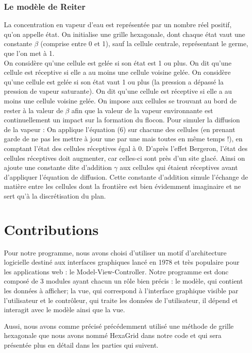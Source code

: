 \documentclass[a4paper,12pt,twoside]{report}
\begin{document}
\subsection{Le modèle de Reiter}La concentration en vapeur d’eau est représentée par un nombre réel positif, qu’on appelle état.
On initialise une grille hexagonale, dont chaque état vaut une constante $\beta$ (comprise entre 0 et 1), sauf la cellule centrale, représentant le germe, que l’on met à 1.\\
On considère qu’une cellule est gelée si son état est 1 ou plus. On dit qu’une cellule est réceptive si elle a au moins une cellule voisine gelée.
\medbreak
On considère qu’une cellule est gelée si son état vaut 1 ou plus (la pression a dépassé la pression de vapeur saturante). On dit qu’une cellule est réceptive si elle a au moins une cellule voisine gelée. On impose aux cellules se trouvant au bord de rester à la valeur de $\beta$ afin que la valeur de la vapeur environnante est continuellement un impact sur la formation du flocon.
\medbreak
Pour simuler la diffusion de la vapeur : On applique l’équation (6) sur chacune des cellules (en prenant garde de ne pas les mettre à jour une par une mais toutes en même temps !), en comptant l’état des cellules réceptives égal à 0.
\medbreak
 D’après l’effet Bergeron, l’état des cellules réceptives doit augmenter, car celles-ci sont près d’un site glacé. Ainsi on ajoute une constante dite d’addition $\gamma$ aux cellules qui étaient réceptives avant d’appliquer l’équation de diffusion. Cette constante d’addition simule l’échange de matière entre les cellules dont la frontière est bien évidemment imaginaire et ne sert qu’à la discrétisation du plan.

\chapter{Contributions}Pour notre programme, nous avons choisi d’utiliser un motif d'architecture logicielle destiné aux interfaces graphiques lancé en 1978 et très populaire pour les applications web : le Model-View-Controller. Notre programme est donc composé de 3 modules ayant chacun un rôle bien précis : le modèle, qui contient les données à afficher; la vue, qui correspond à l’interface graphique visible par l'utilisateur et le contrôleur, qui traite les données de l'utilisateur, il dépend et interagit avec le modèle ainsi que la vue.

Aussi, nous avons comme précisé précédemment utilisé une méthode de grille hexagonale que nous avons nommé HexaGrid dans notre code et qui sera présentée plus en détail dans les parties qui suivent.
\end{document}
